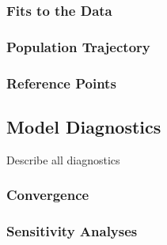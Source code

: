 \documentclass[11pt,
  english,
  a4paper,
]{article}
\begin{document}
\hypertarget{fits-to-the-data}{%
\subsubsection{Fits to the Data}\label{fits-to-the-data}}

\leavevmode\tagmcend\tagstructend


\hypertarget{population-trajectory}{%
\subsubsection{Population Trajectory}\label{population-trajectory}}

\leavevmode\tagmcend\tagstructend


\hypertarget{reference-points-1}{%
\subsubsection{Reference Points}\label{reference-points-1}}

\leavevmode\tagmcend\tagstructend


\hypertarget{model-diagnostics}{%
\subsection{Model Diagnostics}\label{model-diagnostics}}

\leavevmode\tagmcend\tagstructend


Describe all diagnostics

\leavevmode\tagmcend\tagstructend\par


\hypertarget{convergence}{%
\subsubsection{Convergence}\label{convergence}}

\leavevmode\tagmcend\tagstructend


\hypertarget{sensitivity-analyses}{%
\subsubsection{Sensitivity Analyses}\label{sensitivity-analyses}}
\end{document}
